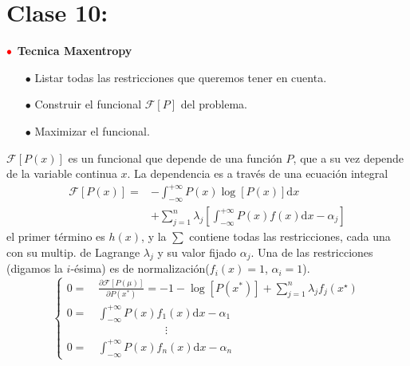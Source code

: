 \documentclass[%
 reprint,
 amsmath,amssymb,
 aps,
]{revtex4-1}
\begin{document}

\section{Clase 10:}

\textbf{$\color{red}{\bullet}$ Tecnica Maxentropy}

\begin{itemize}
  \item[$\bullet$] Listar todas las restricciones que queremos tener en cuenta.
  \item[$\bullet$] Construir el funcional $\mathcal{F}[P]$ del problema.
  \item[$\bullet$] Maximizar el funcional.
\end{itemize}

$\mathcal{F}[P(x)]$ es un funcional que depende de una función $P$, que a su vez depende de la variable
continua $x$. La dependencia es a través de una ecuación integral
$$
\begin{aligned}
  \mathcal{F}[P(x)]=&-\int_{-\infty}^{+\infty} P(x) \log [P(x)] \mathrm{d} x\\
  &+\sum_{j=1}^{n} \lambda_{j}\left[\int_{-\infty}^{+\infty} P(x) f(x) \mathrm{d} x-\alpha_{j}\right]
\end{aligned}
$$
el primer término es $h(x)$, y la $\sum$ contiene todas las restricciones, cada una con su multip. de Lagrange $\lambda_{j}$ y su valor fijado $\alpha_{j}$. Una de las restricciones (digamos la $i$-ésima) es de normalización($f_{i}(x)=1$, $\alpha_{i}=1$). 
$$ \left\lbrace
\begin{aligned}
  0 =& \frac{\partial \mathcal{F}[P(\mu)]}{\partial P\left(x^{*}\right)}=-1-\log \left[P\left(x^{*}\right)\right]+\sum_{j=1}^{n} \lambda_{j} f_{j}\left(x^{\star}\right) \\
  0 =& \int_{-\infty}^{+\infty} P(x) f_1(x) \mathrm{d} x-\alpha_{1} \\
  \qquad & \qquad \qquad \qquad \vdots \\
  0 =& \int_{-\infty}^{+\infty} P(x) f_n(x) \mathrm{d} x-\alpha_{n}
\end{aligned}
\right.
$$
\end{document}
